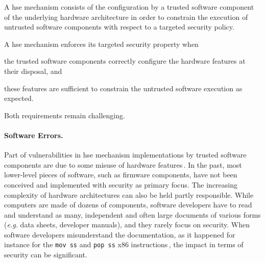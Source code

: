 \begin{definition}
  \label{def:intro:hse}
  A \ac{hse} mechanism consists of the configuration by a trusted software
  component of the underlying hardware architecture in order to constrain the
  execution of untrusted software components with respect to a targeted security
  policy.
\end{definition}

A \ac{hse} mechanism enforces its targeted security property when
%
\begin{inparaenum}[(1)]
\item the trusted software components correctly configure the hardware features
  at their disposal, and
%
\item these features are sufficient to constrain the untrusted software
  execution as expected.
\end{inparaenum}
%
Both requirements remain challenging.

\paragraph{Software Errors.}
%
Part of vulnerabilities in \ac{hse} mechanism implementations by trusted
software components are due to some misuse of hardware
features\,\cite{bulygin2014summary}.
%
In the past, most lower-level pieces of software, such as firmware components,
have not been conceived and implemented with security as primary focus.
%
The increasing complexity of hardware architectures can also be held partly
responsible.
%
While computers are made of dozens of components, software developers have to
read and understand as many, independent and often large documents of various
forms (\emph{e.g.} data sheets, developer manuals), and they rarely focus on
security.
%
When software developers misunderstand the documentation, as it happened for
instance for the \texttt{mov ss} and \texttt{pop ss} x86
instructions\,\cite{movsspopss}, the impact in terms of security can be
significant.

